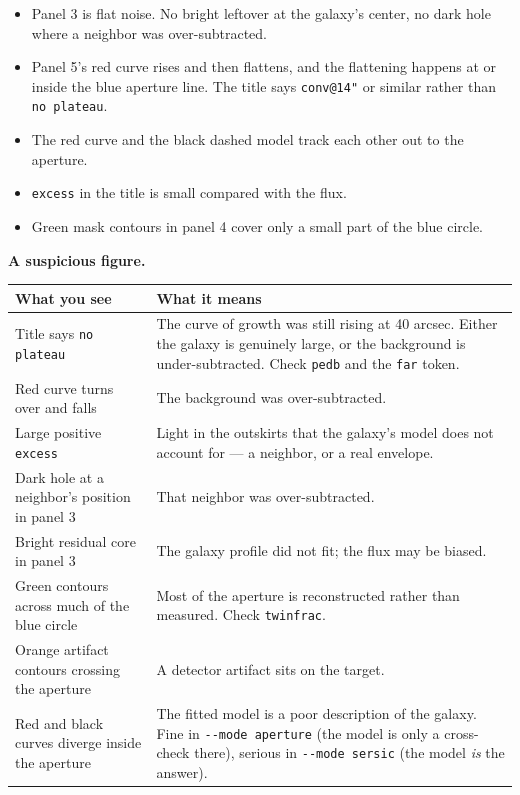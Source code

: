 \documentclass[11pt]{article}
\begin{document}
\begin{itemize}
  \item Panel 3 is flat noise. No bright leftover at the galaxy's center,
        no dark hole where a neighbor was over-subtracted.
  \item Panel 5's red curve rises and then flattens, and the flattening
        happens at or inside the blue aperture line. The title says
        \texttt{conv@14"} or similar rather than \texttt{no plateau}.
  \item The red curve and the black dashed model track each other out to
        the aperture.
  \item \texttt{excess} in the title is small compared with the flux.
  \item Green mask contours in panel 4 cover only a small part of the blue
        circle.
\end{itemize}

\textbf{A suspicious figure.}

\begin{longtable}{L{5.2cm} L{9.2cm}}
\toprule
\textbf{What you see} & \textbf{What it means} \\
\midrule
\endhead
Title says \texttt{no plateau} & The curve of growth was still rising at
  40 arcsec. Either the galaxy is genuinely large, or the background is
  under-subtracted. Check \texttt{pedb} and the \texttt{far}
  token. \\[2pt]
Red curve turns over and falls & The background was over-subtracted. \\[2pt]
Large positive \texttt{excess} & Light in the outskirts that the galaxy's
  model does not account for --- a neighbor, or a real envelope. \\[2pt]
Dark hole at a neighbor's position in panel 3 & That neighbor was
  over-subtracted. \\[2pt]
Bright residual core in panel 3 & The galaxy profile did not fit; the flux
  may be biased. \\[2pt]
Green contours across much of the blue circle & Most of the aperture is
  reconstructed rather than measured. Check \texttt{twinfrac}. \\[2pt]
Orange artifact contours crossing the aperture & A detector artifact sits
  on the target. \\[2pt]
Red and black curves diverge inside the aperture & The fitted model is a
  poor description of the galaxy. Fine in \texttt{-{}-mode aperture} (the
  model is only a cross-check there), serious in
  \texttt{-{}-mode sersic} (the model \emph{is} the answer). \\
\bottomrule
\end{longtable}
\end{document}
